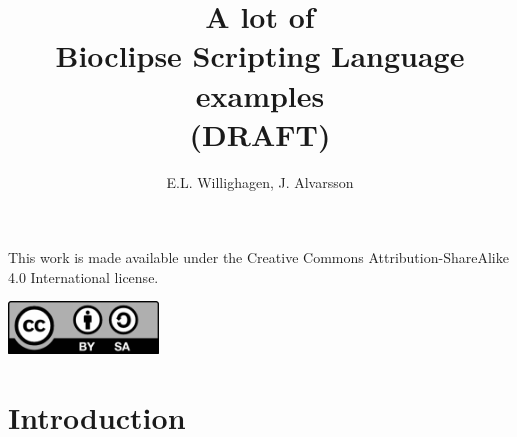 \documentclass{book}
\title{A lot of \\ Bioclipse Scripting Language \\ examples \\ (DRAFT)}
\author{E.L. Willighagen, J. Alvarsson}
\begin{document}
\maketitle

\mbox{}\vfill
{\small \noindent This work is made available under the Creative Commons Attribution-ShareAlike 4.0 International license.}
\vfill
\begin{center}
	\includegraphics[width=0.3\textwidth]{ccbysa.png}
\end{center}

\tableofcontents

\chapter{Introduction}
\end{document}
